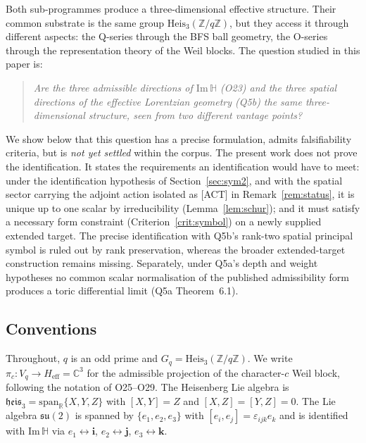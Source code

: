 \documentclass[11pt,a4paper]{article}
\newcommand{\Heis}{\mathrm{Heis}_3}
\newcommand{\Heff}{H_{\mathrm{eff}}}
\newcommand{\ImH}{\mathrm{Im}\,\mathbb{H}}
\newcommand{\su}{\mathfrak{su}}
\newcommand{\heis}{\mathfrak{heis}_3}
\begin{document}
    Both sub-programmes produce a three-dimensional effective structure.
    Their common substrate is the same group $\Heis(\mathbb{Z}/q\mathbb{Z})$, but they access it
    through different aspects: the Q-series through the BFS ball geometry, the O-series through
    the representation theory of the Weil blocks.
    The question studied in this paper is:

    \begin{quote}
      \emph{Are the three admissible directions of $\ImH$ (O23) and the three spatial directions
      of the effective Lorentzian geometry (Q5b) the same three-dimensional structure, seen from
      two different vantage points?}
    \end{quote}

    \noindent
    We show below that this question has a precise formulation, admits falsifiability criteria,
    but is \emph{not yet settled} within the corpus.
    The present work does not prove the identification.
    It states the requirements an identification would have to meet: under the identification
    hypothesis of Section~\ref{sec:sym2}, and with the spatial sector carrying the adjoint action
    isolated as [ACT] in Remark~\ref{rem:status}, it is unique up to one scalar by irreducibility
    (Lemma~\ref{lem:schur}); and it must
    satisfy a necessary form constraint (Criterion~\ref{crit:symbol}) on a newly supplied
    extended target.
    The precise identification with Q5b's rank-two spatial principal symbol is ruled out by rank
    preservation, whereas the broader extended-target construction remains missing.
    Separately, under Q5a's depth and weight hypotheses no common scalar normalisation of the
    published admissibility form produces a toric differential limit (Q5a Theorem~6.1).

  \subsection{Conventions}
    \label{sec:conv}

    Throughout, $q$ is an odd prime and $G_q = \Heis(\mathbb{Z}/q\mathbb{Z})$.
    We write $\pi_c : V_q \to \Heff = \mathbb{C}^3$ for the admissible projection of the
    character-$c$ Weil block, following the notation of O25--O29.
    The Heisenberg Lie algebra is $\heis = \mathrm{span}_\mathbb{R}\{X, Y, Z\}$ with $[X,Y] = Z$
    and $[X,Z] = [Y,Z] = 0$.
    The Lie algebra $\su(2)$ is spanned by $\{e_1, e_2, e_3\}$ with
    $[e_i, e_j] = \varepsilon_{ijk} e_k$ and is identified with $\ImH$ via
    $e_1 \leftrightarrow \mathbf{i}$, $e_2 \leftrightarrow \mathbf{j}$, $e_3 \leftrightarrow \mathbf{k}$.
\end{document}
